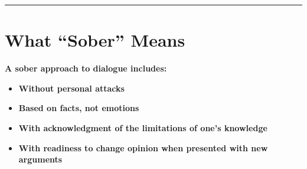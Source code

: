 \documentclass{article}
\begin{document}
\vspace{1cm}
\hrule
\vspace{0.5cm}

\section*{What ``Sober'' Means}

\textbf{A sober approach to dialogue includes:}

\begin{itemize}[label=--]
    \item \textbf{Without personal attacks}
    \item \textbf{Based on facts, not emotions}
    \item \textbf{With acknowledgment of the limitations of one's knowledge}
    \item \textbf{With readiness to change opinion when presented with new arguments}
\end{itemize}
\end{document}
